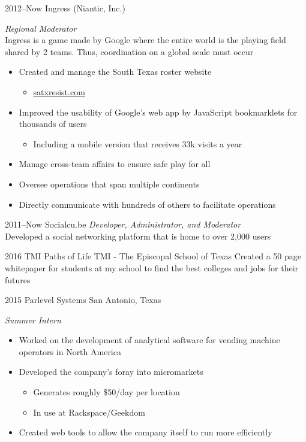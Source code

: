 \documentclass[]{friggeri-cv} %
\begin{document}

\begin{entrylist}

	\entry
	{2012--Now}
	{Ingress (Niantic, Inc.)}
	{}
	{\emph{Regional Moderator} \\
		Ingress is a game made by Google where the entire world is the playing field shared by 2 teams. Thus, coordination on a global scale must occur
		\begin{itemize}
			\item Created and manage the South Texas roster website
				\begin{itemize}
					\item \href{http://satxresist.com}{satxresist.com}
				\end{itemize}
			\item Improved the usability of Google's web app by JavaScript bookmarklets for thousands of users
				\begin{itemize}
					\item Including a mobile version that receives 33k visits a year
				\end{itemize}
			\item Manage cross-team affairs to ensure safe play for all
			\item Oversee operations that span multiple continents
			\item Directly communicate with hundreds of others to facilitate operations
		\end{itemize}
	}

	\entry
	{2011--Now}
	{Socialcu.be}
	{}
	{\emph{Developer, Administrator, and Moderator} \\
	Developed a social networking platform that is home to over 2,000 users}


	\entry
	{2016}
	{TMI Paths of Life}
	{TMI - The Episcopal School of Texas}
	{Created a 50 page whitepaper for students at my school to find the best colleges and jobs for their futures}


	\entry
	{2015}
	{Parlevel Systems}
	{San Antonio, Texas}
	{\emph{Summer Intern}
		\begin{itemize}
			\item Worked on the development of analytical software for vending machine operators in North America
			\item Developed the company's foray into micromarkets
				\begin{itemize}
					\item Generates roughly \$50/day per location
					\item In use at Rackspace/Geekdom
				\end{itemize}
			\item Created web tools to allow the company itself to run more efficiently
		\end{itemize}
	}


\end{entrylist}
\end{document}
